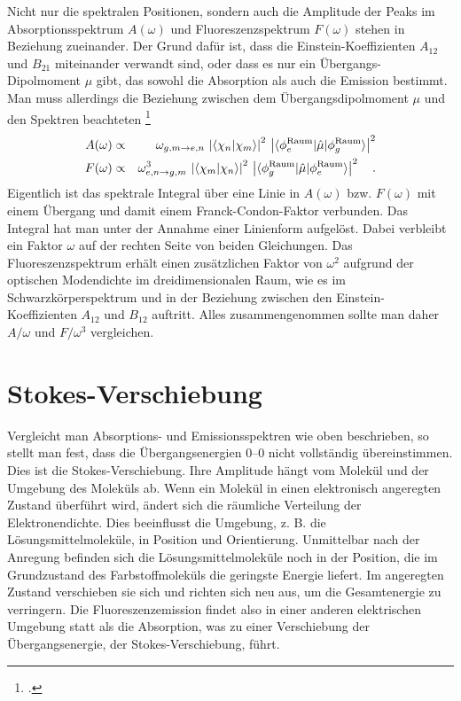 Nicht nur die spektralen Positionen, sondern auch die Amplitude der Peaks im Absorptionsspektrum $A(\omega)$ und Fluoreszenzspektrum $F(\omega)$ stehen in Beziehung zueinander. Der Grund dafür ist, dass die Einstein-Koeffizienten $A_{12}$ und $B_{21}$ miteinander verwandt sind, oder dass es nur ein Übergangs-Dipolmoment $\mu$ gibt, das sowohl die Absorption als auch die Emission bestimmt. Man muss allerdings die Beziehung zwischen dem Übergangsdipolmoment $\mu$ und den Spektren beachteten \footcite[Kapitel 5.2]{Parson}
\begin{eqnarray}
   A(\omega  )  & \propto & \omega_{g,m \rightarrow e,n}  \,  \left| \braket{\chi_n |  \chi_m} \right|^2 
\,  \left| \braket{\phi^\text{Raum}_e | \hat{\mu} | \phi^\text{Raum}_g} \right|^2 \\
   F(\omega ) & \propto & \omega_{e,n \rightarrow g,m}^3 \,  \left| \braket{\chi_m |  \chi_n} \right|^2 
\,  \left|\braket{\phi^\text{Raum}_g | \hat{\mu} | \phi^\text{Raum}_e} \right|^2 \quad .
\end{eqnarray}
Eigentlich ist das spektrale Integral über eine Linie in $A(\omega  )$ bzw. $F(\omega)$ mit einem Übergang und damit einem Franck-Condon-Faktor verbunden. Das Integral hat man unter der Annahme einer Linienform aufgelöst. Dabei verbleibt ein Faktor $\omega$ auf der rechten Seite von beiden Gleichungen. Das Fluoreszenzspektrum erhält einen zusätzlichen Faktor von $\omega^2$ aufgrund der optischen Modendichte im dreidimensionalen Raum, wie es im Schwarzkörperspektrum und in der  Beziehung zwischen den Einstein-Koeffizienten $A_{12}$ und $B_{12}$ auftritt.
Alles zusammengenommen sollte man daher $A / \omega$ und $F / \omega^3$ vergleichen.


\section{Stokes-Verschiebung}

Vergleicht man Absorptions- und Emissionsspektren wie oben beschrieben, so stellt man fest, dass die Übergangsenergien 0--0 nicht vollständig übereinstimmen. Dies ist die Stokes-Verschiebung. Ihre Amplitude hängt vom Molekül und der Umgebung des Moleküls ab. Wenn ein Molekül in einen elektronisch angeregten Zustand überführt wird, ändert sich die räumliche Verteilung der Elektronendichte. Dies beeinflusst die Umgebung, z. B. die Lösungsmittelmoleküle, in Position und Orientierung. Unmittelbar nach der Anregung befinden sich die Lösungsmittelmoleküle noch in der Position, die im Grundzustand des Farbstoffmoleküls die geringste Energie liefert. Im angeregten Zustand verschieben sie sich und richten sich neu aus, um die Gesamtenergie zu verringern. Die Fluoreszenzemission findet also in einer anderen elektrischen Umgebung statt als die Absorption, was zu einer Verschiebung der Übergangsenergie, der Stokes-Verschiebung, führt.

